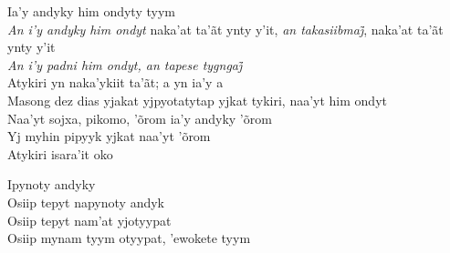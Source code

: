 \begin{linenumbers}\begingroup\raggedright
 
\noindent   Ia'y andyky him ondyty tyym\\
  \emph{An i’y andyky him ondyt} naka’at ta’ãt ynty y’it, \emph{an takasiibmaj̃}, naka’at ta’ãt ynty y’it\\
  \emph{An i’y padni him ondyt, an tapese tygngaj̃}\\
  Atykiri yn naka'ykiit ta'ãt; a yn ia'y a\\
  Masong dez dias yjakat yjpyotatytap yjkat tykiri, naa'yt him ondyt\\
  Naa'yt sojxa, pikomo, 'õrom ia'y andyky 'õrom\\
  Yj myhin pipyyk yjkat naa'yt 'õrom\\
  Atykiri isara'it oko
 
\end{linenumbers}\endgroup

\bigskip

\begin{linenumbers}\begingroup\raggedright
 
\noindent   Ipynoty andyky\\
  Osiip tepyt napynoty andyk\\
  Osiip tepyt nam'at yjotyypat\\
  Osiip mynam tyym otyypat, 'ewokete tyym
 
\end{linenumbers}\endgroup

\bigskip

